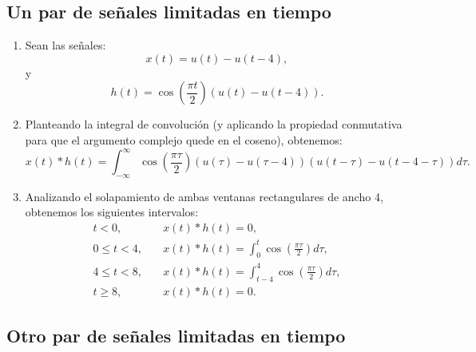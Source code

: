 \subsection{Un par de señales limitadas en tiempo}

\begin{enumerate}
	
	\item Sean las señales:
	\begin{equation}
		x(t) = u(t) - u(t-4),
	\end{equation}
	y
	\begin{equation}
		h(t) = \cos\left( \frac{\pi t}{2}\right) \left( u(t) - u(t-4) \right).
	\end{equation}
	
	\item Planteando la integral de convolución (y aplicando la propiedad conmutativa para que el argumento complejo quede en el coseno), obtenemos:
	\begin{equation}
		x(t) * h(t) = \int_{-\infty}^{\infty} \cos\left( \frac{\pi \tau}{2}\right) \left( u(\tau) - u(\tau -4) \right) \left( u(t-\tau) - u(t-4-\tau) \right) d\tau .
	\end{equation}
	
	\item Analizando el solapamiento de ambas ventanas rectangulares de ancho 4, obtenemos los siguientes intervalos:
	\begin{align}
		t < 0, &\quad x(t) * h(t) = 0, \\
		0 \leq t < 4, &\quad x(t) * h(t) = \int_{0}^{t} \cos\left( \frac{\pi \tau}{2}\right) d\tau , \\
		4 \leq t < 8, &\quad x(t) * h(t) = \int_{t-4}^{4} \cos\left( \frac{\pi \tau}{2}\right) d\tau , \\
		t \geq 8, &\quad x(t) * h(t) = 0.
	\end{align}
	
\end{enumerate}

\subsection{Otro par de señales limitadas en tiempo}


